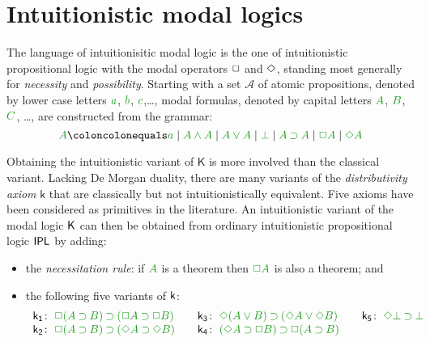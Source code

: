 %
%
\section{Intuitionistic modal logics}\label{sec:intmod}




The language of {intuitionisitic modal logic} is the one of intuitionistic propositional logic with the modal operators $\mathord{\Box}$ and $\mathord{\Diamond}$, standing most generally for \emph{necessity} and \emph{possibility}.
%
Starting with a set $\mathcal{A}$ of atomic propositions, denoted by lower case letters $\fm a$, $\fm b$, $\fm c$,\ldots, modal formulas, denoted by capital letters $\fm A$, $\fm B$, $\fm C$, \ldots, are constructed from the grammar:
%
$$
\fm A \coloncolonequals
\fm a \mid \fm{A \AND A} \mid \fm{A \OR A} \mid \fm \BOT \mid \fm{A \IMP A} \mid \fm{\BOX A} \mid \fm{\DIA A}
$$
%

Obtaining the intuitionistic variant of $\mathsf{K}$ is more involved than the classical variant. 
Lacking De Morgan duality, there are many variants of the \emph{distributivity axiom} $\mathsf{k}$ that are classically but not intuitionistically equivalent. Five axioms have been considered as primitives in the literature. An intuitionistic variant of the modal logic $\mathsf{K}$ can then be obtained from ordinary intuitionistic propositional logic $\mathsf{IPL}$ by adding:
%

\begin{itemize}
	\item the \emph{necessitation rule}: if $\fm A$ is a theorem then $\fm{\BOX A}$ is also a theorem; and
	\item the following five variants of $\mathsf{k}$:
	\begin{equation*}
	\label{eq:ik}%
	\begin{array}[t]{r@{\;}l@{\qquad}r@{\;}l@{\qquad}r@{\;}l}
	\kax[1]\colon&\fm{\BOX(A\IMP B)\IMP(\BOX A\IMP\BOX B)}
	&
	\kax[3]\colon&\fm{\DIA(A\OR B)\IMP(\DIA A\OR\DIA B)}
	&
	\kax[5]\colon&\fm{\DIA\BOT\IMP\BOT}
	\\
	\kax[2]\colon&\fm{\BOX(A\IMP B)\IMP(\DIA A\IMP\DIA B)}
	&
	\kax[4]\colon&\fm{(\DIA A\IMP \BOX B)\IMP\BOX(A\IMP B)}\\%
	\end{array}
	\end{equation*}
\end{itemize}

